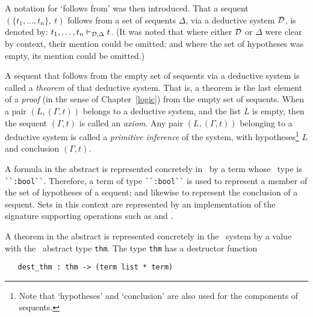  A notation for `follows from' was then
introduced.  That a sequent $(\{t_1,\ldots,t_n\},\ t)$ follows from a
set of sequents $\Delta$, via a deductive system ${\cal D}$, is
denoted by: $t_1,\ldots,t_n\vdash_{{\cal D},\Delta} t$.  (It was noted
that where either ${\cal D}$ or $\Delta$ were clear by context, their
mention could be omitted; and where the set of hypotheses was empty,
its mention could be omitted.)

A sequent that follows from the empty set of sequents via a deductive
system is called a \textit{theorem} of that deductive system.  That
is, a theorem is the last
element of a \textit{proof} (in the
sense of Chapter~\ref{logic}) from the empty set of sequents. When a
pair $(L,(\Gamma,t))$ belongs to a deductive system, and the list $L$
is empty, then the sequent $(\Gamma,t)$ is called an
\textit{axiom}.  Any pair
$(L,(\Gamma,t))$ belonging to a deductive system is called a
\textit{primitive inference} of the
system, with hypotheses\footnote{Note that `hypotheses' and
  `conclusion' are also used for the components of sequents.} $L$ and
conclusion $(\Gamma,t)$.

A formula in the abstract is represented concretely in \HOL\ by a
term whose \HOL\ type is {\small\verb+``:bool``+}.  Therefore, a
term of type {\small\verb+``:bool``+} is used to represent a
member of the set of hypotheses of a sequent; and likewise to
represent the conclusion of a sequent.  Sets in this context are
represented by an implementation of the \ML{} signature 
supporting operations such as  and
.

A theorem in the abstract is represented concretely in the \HOL\
system by a value with the \ML\ abstract type
{\small\verb+thm+}.  The type {\small\verb+thm+}
has a destructor function

\begin{boxed}
\begin{verbatim}
   dest_thm : thm -> (term list * term)
\end{verbatim}\end{boxed}

